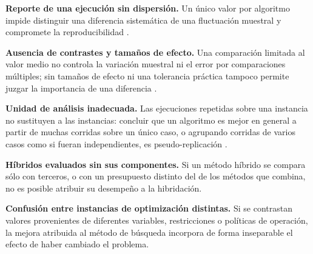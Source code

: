 \textbf{Reporte de una ejecución sin dispersión.} Un único valor por algoritmo impide distinguir una diferencia sistemática de una fluctuación muestral y compromete la reproducibilidad \cite{Crepinsek2014Pitfalls}.

\textbf{Ausencia de contrastes y tamaños de efecto.} Una comparación limitada al valor medio no controla la variación muestral ni el error por comparaciones múltiples; sin tamaños de efecto ni una tolerancia práctica tampoco permite juzgar la importancia de una diferencia \cite{Derrac2011Tutorial,Arcuri2014Hitchhiker}.

\textbf{Unidad de análisis inadecuada.} Las ejecuciones repetidas sobre una instancia no sustituyen a las instancias: concluir que un algoritmo es mejor en general a partir de muchas corridas sobre un único caso, o agrupando corridas de varios casos como si fueran independientes, es pseudo-replicación \cite{Demsar2006Statistical,Hurlbert1984Pseudoreplication}.

\textbf{Híbridos evaluados sin sus componentes.} Si un método híbrido se compara sólo con terceros, o con un presupuesto distinto del de los métodos que combina, no es posible atribuir su desempeño a la hibridación.

\textbf{Confusión entre instancias de optimización distintas.} Si se contrastan valores provenientes de diferentes variables, restricciones o políticas de operación, la mejora atribuida al método de búsqueda incorpora de forma inseparable el efecto de haber cambiado el problema.
